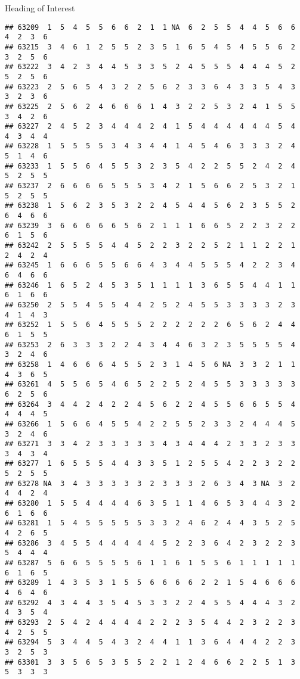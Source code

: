 \documentclass[
  ignorenonframetext,
]{beamer}
\begin{document}
\begin{frame}[fragile]{Heading of Interest}
\begin{verbatim}
## 63209  1  5  4  5  5  6  6  2  1  1 NA  6  2  5  5  4  4  5  6  6  4  2  3  6
## 63215  3  4  6  1  2  5  5  2  3  5  1  6  5  4  5  4  5  5  6  2  3  2  5  6
## 63222  3  4  2  3  4  4  5  3  3  5  2  4  5  5  5  4  4  4  5  2  5  2  5  6
## 63223  2  5  6  5  4  3  2  2  5  6  2  3  3  6  4  3  3  5  4  3  3  2  3  6
## 63225  2  5  6  2  4  6  6  6  1  4  3  2  2  5  3  2  4  1  5  5  3  4  2  6
## 63227  2  4  5  2  3  4  4  4  2  4  1  5  4  4  4  4  4  4  5  4  4  3  4  4
## 63228  1  5  5  5  5  3  4  3  4  4  1  4  5  4  6  3  3  3  2  4  5  1  4  6
## 63233  1  5  5  6  4  5  5  3  2  3  5  4  2  2  5  5  2  4  2  4  5  2  5  5
## 63237  2  6  6  6  6  5  5  5  3  4  2  1  5  6  6  2  5  3  2  1  5  2  5  5
## 63238  1  5  6  2  3  5  3  2  2  4  5  4  4  5  6  2  3  5  5  2  6  4  6  6
## 63239  3  6  6  6  6  6  5  6  2  1  1  1  6  6  5  2  2  3  2  2  6  1  5  6
## 63242  2  5  5  5  5  4  4  5  2  2  3  2  2  5  2  1  1  2  2  1  2  4  2  4
## 63245  1  6  6  6  5  5  6  6  4  3  4  4  5  5  5  4  2  2  3  4  6  4  6  6
## 63246  1  6  5  2  4  5  3  5  1  1  1  1  3  6  5  5  4  4  1  1  6  1  6  6
## 63250  2  5  5  4  5  5  4  4  2  5  2  4  5  5  3  3  3  3  2  3  4  1  4  3
## 63252  1  5  5  6  4  5  5  5  2  2  2  2  2  2  6  5  6  2  4  4  6  1  5  5
## 63253  2  6  3  3  3  2  2  4  3  4  4  6  3  2  3  5  5  5  5  4  3  2  4  6
## 63258  1  4  6  6  6  4  5  5  2  3  1  4  5  6 NA  3  3  2  1  1  4  3  6  5
## 63261  4  5  5  6  5  4  6  5  2  2  5  2  4  5  5  3  3  3  3  3  6  2  5  6
## 63264  3  4  4  2  4  2  2  4  5  6  2  2  4  5  5  6  6  5  5  4  4  4  4  5
## 63266  1  5  6  6  4  5  5  4  2  2  5  5  2  3  3  2  4  4  4  5  3  2  4  6
## 63271  3  3  4  2  3  3  3  3  3  4  3  4  4  4  2  3  3  2  3  3  3  4  3  4
## 63277  1  6  5  5  5  4  4  3  3  5  1  2  5  5  4  2  2  3  2  2  5  2  5  5
## 63278 NA  3  4  3  3  3  3  3  2  3  3  3  2  6  3  4  3 NA  3  2  4  4  2  4
## 63280  1  5  5  4  4  4  4  6  3  5  1  1  4  6  5  3  4  4  3  2  6  1  6  6
## 63281  1  5  4  5  5  5  5  5  3  3  2  4  6  2  4  4  3  5  2  5  4  2  6  5
## 63286  3  4  5  5  4  4  4  4  4  5  2  2  3  6  4  2  3  2  2  3  5  4  4  4
## 63287  5  6  6  5  5  5  5  6  1  1  6  1  5  5  6  1  1  1  1  1  6  1  6  5
## 63289  1  4  3  5  3  1  5  5  6  6  6  6  2  2  1  5  4  6  6  6  4  6  4  6
## 63292  4  3  4  4  3  5  4  5  3  3  2  2  4  5  5  4  4  4  3  2  4  3  5  4
## 63293  2  5  4  2  4  4  4  4  2  2  2  3  5  4  4  2  3  2  2  3  4  2  5  5
## 63294  5  3  4  4  5  4  3  2  4  4  1  1  3  6  4  4  4  2  2  3  3  2  5  3
## 63301  3  3  5  6  5  3  5  5  2  2  1  2  4  6  6  2  2  5  1  3  5  3  3  3

\end{verbatim}
\end{frame}
\end{document}

